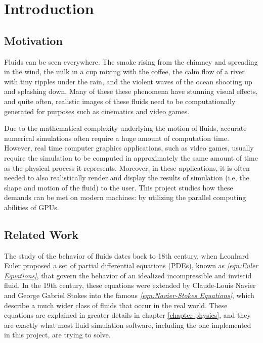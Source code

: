\chapter{Introduction}

\section{Motivation}
Fluids can be seen everywhere. The smoke rising from the chimney and spreading in the wind, the milk in a cup mixing with the coffee, the calm flow of a river with tiny ripples under the rain, and the violent waves of the ocean shooting up and splashing down. Many of these these phenomena have stunning visual effects, and quite often, realistic images of these fluids need to be computationally generated for purposes such as cinematics and video games. 


Due to the mathematical complexity underlying the motion of fluids, accurate numerical simulations often require a huge amount of computation time. However, real time computer graphics applications, such as video games, usually require the simulation to be computed in approximately the same amount of time as the physical process it represents. Moreover, in these applications, it is often needed to also realistically render and display the results of simulation (i.e, the shape and motion of the fluid) to the user. This project studies how these demands can be met on modern machines: by utilizing the parallel computing abilities of GPUs.





\section{Related Work}



The study of the behavior of fluids dates back to 18th century, when Leonhard Euler proposed a set of partial differential equations (PDEs), known as \textit{\ref{eqn:Euler Equations}}, that govern the behavior of an idealized incompressible and inviscid fluid. In the 19th century, these equations were extended by Claude-Louis Navier and George Gabriel Stokes into the famous \textit{\ref{eqn:Navier-Stokes Equations}}, which describe a much wider class of fluids that occur in the real world. These equations are explained in greater details in chapter \ref{chapter physics}, and they are exactly what most fluid simulation software, including the one implemented in this project, are trying to solve. 


